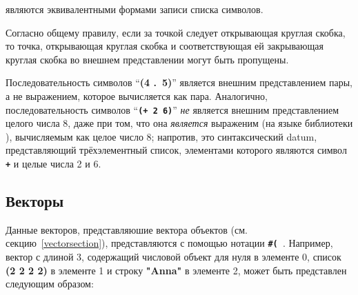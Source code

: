 являются эквивалентными формами записи списка символов.

Согласно общему правилу, если за точкой следует открывающая круглая скобка, то точка,
открывающая круглая скобка и соответствующая ей закрывающая круглая скобка во внешнем
представлении могут быть пропущены.

Последовательность символов ``{\cf\bfseries (4 .\ 5)}'' является внешним представлением пары, а не
выражением, которое вычисляется как пара. Аналогично, последовательность символов ``{\tt\bfseries (+ 2 6)}''
{\em не} является внешним представлением целого числа 8, даже при том, что она {\em является} выраженим
(на языке библиотеки {\bfseries{}}), вычисляемым как целое число 8; напротив, это
синтаксический datum, представляющий трёхэлементный список, элементами которого являются
символ {\tt\bfseries +} и целые числа 2 и 6.

\subsection{Векторы}
\label{vectorsyntax}

Данные векторов, представляюшие вектора объектов (см. секцию~\ref{vectorsection}),
представляются с помощью нотации {\tt{\bfseries\#(}
  \dotsfoo{\bfseries)}}. Например, вектор с длиной 3, содержащий числовой объект для нуля в
элементе 0, список {\cf\bfseries (2 2 2 2)} в элементе 1 и строку {\cf\bfseries "Anna"} в
элементе 2, может быть представлен следующим образом:

